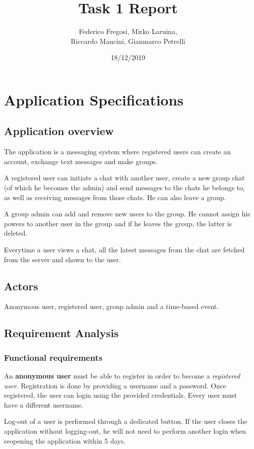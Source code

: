 \documentclass[10pt]{article}
\title{Task 1 Report}
\date{18/12/2019}
\author{Federico Fregosi, Mirko Laruina,\\
        Riccardo Mancini, Gianmarco Petrelli}
\begin{document}
\maketitle
\vfill
\tableofcontents
\vfill
\clearpage
\setcounter{page}{1}

\section{Application Specifications}
\subsection{Application overview}
The application is a messaging system where registered users can create an 
account, exchange text messages and make groups.

A registered user can initiate a chat with another user, create a new group chat
(of which he becomes the admin) and send messages to the chats he belongs to,
as well as receiving messages from those chats. He can also leave a group.

A group admin can add and remove new users to the group. He cannot assign his
powers to another user in the group and if he leaves the group, the latter 
is deleted.

Everytime a user views a chat, all the latest messages from the chat are fetched from 
the server and shown to the user.

\subsection{Actors}
Anonymous user, registered user, group admin and a time-based event.

\subsection{Requirement Analysis}
\subsubsection{Functional requirements}

An \textbf{anonymous user} must be able to register in order to become a 
\emph{registered user}. Registration is done by providing a username and a 
password. Once registered, the user can login using the provided credentials. 
Every user must have a different username.

Log-out of a user is performed through a dedicated button. If the user closes 
the application without logging-out, he will not need to perform another login 
when reopening the application within 5 days.
\end{document}
